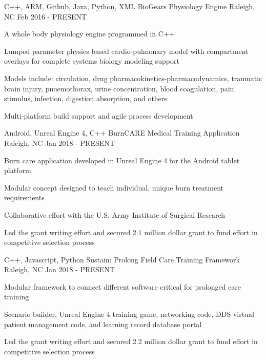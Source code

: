 
\begin{cventries}

  \cventry
    {C++, ARM, Github, Java, Python, XML} %
    {BioGears Physiology Engine} %
    {Raleigh, NC} %
    {Feb 2016 - PRESENT} %
    {
      \begin{cvitems} %
        \item {A whole body physiology engine programmed in C++}
        \item {Lumped parameter physics based cardio-pulmonary model with compartment overlays for complete systems biology modeling support}
        \item {Models include: circulation, drug pharmacokinetics-pharmacodynamics, traumatic brain injury, pnuemothorax, urine concentration, blood coagulation, pain stimulus, infection, digestion absorption, and others}
		    \item {Multi-platform build support and agile process development}
      \end{cvitems}
    }

  \cventry
    {Android, Unreal Engine 4, C++} %
    {BurnCARE Medical Training Application} %
    {Raleigh, NC} %
    {Jan 2018 - PRESENT} %
    {
      \begin{cvitems} %
      	\item {Burn care application developed in Unreal Engine 4 for the Android tablet platform}
		    \item {Modular concept designed to teach individual, unique burn treatment requirements}
        \item {Collaborative effort with the U.S. Army Institute of Surgical Research}
        \item {Led the grant writing effort and secured 2.1 million dollar grant to fund effort in competitive selection process}
      \end{cvitems}
    }

  \cventry
    {C++, Javascript, Python} %
    {Sustain: Prolong Field Care Training Framework } %
    {Raleigh, NC} %
    {Jan 2018 - PRESENT} %
    {
      \begin{cvitems} %
        \item {Modular framework to connect different software critical for prolonged care training}
        \item {Scenario builder, Unreal Engine 4 training game, networking code, DDS virtual patient management code, and learning record database portal}
        \item {Led the grant writing effort and secured 2.2 million dollar grant to fund effort in competitive selection process}
      \end{cvitems}
    }


\end{cventries}
